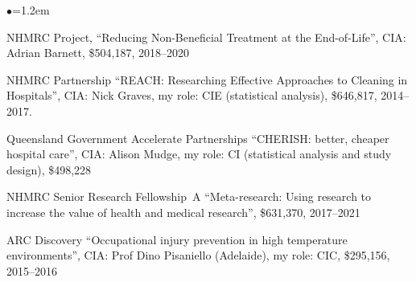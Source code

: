 \documentclass[a4paper,11pt]{article}
\renewcommand{\labelitemi}{$\bullet$}
\begin{document}
\begin{raggedright}
\begin{list}{\labelitemi}{\leftmargin=1.2em}
\item NHMRC Project, ``Reducing Non-Beneficial Treatment at the End-of-Life'', CIA: Adrian Barnett, \$504,187, 2018--2020

\item NHMRC Partnership ``REACH: Researching Effective Approaches to Cleaning in Hospitals'', CIA: Nick Graves, my role: CIE (statistical analysis), \$646,817, 2014--2017.

\item Queensland Government Accelerate Partnerships ``CHERISH: better, cheaper hospital care'', CIA: Alison Mudge, my role: CI (statistical analysis and study design), \$498,228 %

\item NHMRC Senior Research Fellowship~A ``Meta-research: Using research to increase the value of health and medical research'', \$631,370, 2017--2021


\item ARC Discovery ``Occupational injury prevention in high temperature environments'', CIA: Prof Dino Pisaniello (Adelaide), my role: CIC, \$295,156, 2015--2016

\end{list}


\end{raggedright}
\end{document}
